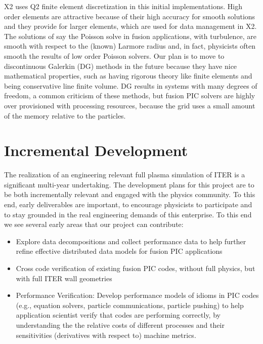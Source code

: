 \documentclass[review]{siamart}
\begin{document}
X2 uses Q2 finite element discretization in this initial implementations.
High order elements are attractive because of their high accuracy for smooth solutions and they provide for larger elements, which are used for data management in X2.
The solutions of say the Poisson solve in fusion applications, with turbulence, are smooth with respect to the (known) Larmore radius and, in fact, physicists often smooth the results of low order Poisson solvers.
Our plan is to move to discontinuous Galerkin (DG) methods in the future because they have nice mathematical properties, such as having rigorous theory like finite elements and being conservative line finite volume.
DG results in systems with many degrees of freedom, a common criticism of these methods, but fusion PIC solvers are highly over provisioned with processing resources, because the grid uses a small amount of the memory relative to the particles.

\section{Incremental Development}

The realization of an engineering relevant full plasma simulation of ITER is a significant multi-year undertaking.
The development plans for this project are to be both incrementally relevant and engaged with the physics community.
To this end, early deliverables are important, to encourage physicists to participate and to stay grounded in the real engineering demands of this enterprise.
To this end we see several early areas that our project can contribute:
\begin{itemize}
\item Explore data decompositions and collect performance data to help further refine effective distributed data models for fusion PIC applications
\item Cross code verification of existing fusion PIC codes, without full physics, but with full ITER wall geometries
\item Performance Verification: Develop performance models of idioms in PIC codes (e.g., equation solvers, particle communications, particle pushing) to help application scientist verify that codes are performing correctly, by understanding the the relative costs of different processes and their sensitivities (derivatives with respect to) machine metrics.
\end{itemize}
 




 
\end{document}
